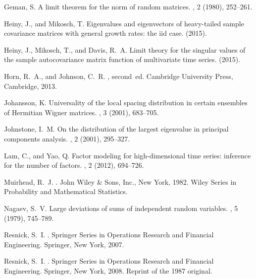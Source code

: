 \documentclass[11pt,reqno]{amsart}
\newcommand{\1}{\mathbf{1}}
\newcommand{\0}{\boldsymbol{0}}
\newcommand{\4}{\mathchoice{\mskip1.5mu}{\mskip1.5mu}{}{}}
\newcommand{\5}{\mathchoice{\mskip-1.5mu}{\mskip-1.5mu}{}{}}
\newcommand{\2}{\penalty250\mskip\thickmuskip\mskip-\thinmuskip} %
\begin{document}
\begin{thebibliography}{10}
{\sc Geman, S.}
\newblock A limit theorem for the norm of random matrices.
, 2 (1980), 252--261.

{\sc Heiny, J., and Mikosch, T.}
\newblock Eigenvalues and eigenvectors of heavy-tailed sample covariance
  matrices with general growth rates: the iid case.
 (2015).

{\sc Heiny, J., Mikosch, T., and Davis, R.~A.}
\newblock Limit theory for the singular values of the sample autocovariance
  matrix function of multivariate time series.
 (2015).

{\sc Horn, R.~A., and Johnson, C.~R.}
, second~ed.
\newblock Cambridge University Press, Cambridge, 2013.

{\sc Johansson, K.}
\newblock Universality of the local spacing distribution in certain ensembles
  of {H}ermitian {W}igner matrices.
, 3 (2001), 683--705.

{\sc Johnstone, I.~M.}
\newblock On the distribution of the largest eigenvalue in principal components
  analysis.
, 2 (2001), 295--327.

{\sc Lam, C., and Yao, Q.}
\newblock Factor modeling for high-dimensional time series: inference for the
  number of factors.
, 2 (2012), 694--726.

{\sc Muirhead, R.~J.}
.
\newblock John Wiley \& Sons, Inc., New York, 1982.
\newblock Wiley Series in Probability and Mathematical Statistics.

{\sc Nagaev, S.~V.}
\newblock Large deviations of sums of independent random variables.
, 5 (1979), 745--789.

{\sc Resnick, S.~I.}
.
\newblock Springer Series in Operations Research and Financial Engineering.
  Springer, New York, 2007.

{\sc Resnick, S.~I.}
.
\newblock Springer Series in Operations Research and Financial Engineering.
  Springer, New York, 2008.
\newblock Reprint of the 1987 original.


\end{thebibliography}
\end{document}
